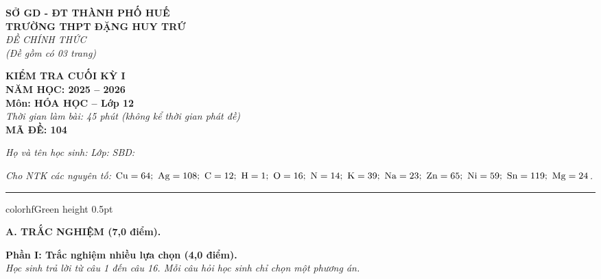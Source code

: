 \documentclass[11pt,a4paper]{article}
\begin{document}
\begin{minipage}[t]{0.48\textwidth}
\textbf{SỞ GD - ĐT THÀNH PHỐ HUẾ}\\
\textbf{TRƯỜNG THPT ĐẶNG HUY TRỨ}\\
\textit{ĐỀ CHÍNH THỨC}\\
\textit{(Đề gồm có 03 trang)}
\end{minipage}
\hfill
\begin{minipage}[t]{0.48\textwidth}
\raggedleft
\textbf{\color{hfRed}KIỂM TRA CUỐI KỲ I}\\
\textbf{NĂM HỌC: 2025 -- 2026}\\
\textbf{Môn: HÓA HỌC -- Lớp 12}\\
\textit{Thời gian làm bài: 45 phút (không kể thời gian phát đề)}\\
\textbf{MÃ ĐỀ: 104}
\end{minipage}

\vspace{4pt}
\noindent
\textit{Họ và tên học sinh:} \dotfill \textit{Lớp:} \dotfill \textit{SBD:} \dotfill

\vspace{3pt}
\noindent
\textit{\footnotesize Cho NTK các nguyên tố: $\ce{Cu}=64;\ \ce{Ag}=108;\ \ce{C}=12;\ \ce{H}=1;\ \ce{O}=16;\ \ce{N}=14;\ \ce{K}=39;\ \ce{Na}=23;\ \ce{Zn}=65;\ \ce{Ni}=59;\ \ce{Sn}=119;\ \ce{Mg}=24$.}

\vspace{3pt}
\hrule color{hfGreen} height 0.5pt

\vspace{4pt}
\noindent
{\color{mainGreen}\textbf{\Large A. TRẮC NGHIỆM (7,0 điểm).}}

\vspace{3pt}
\noindent
{\color{mainGreen}\textbf{\large Phần I: Trắc nghiệm nhiều lựa chọn (4,0 điểm).}}\\
\textit{\small Học sinh trả lời từ câu 1 đến câu 16. Mỗi câu hỏi học sinh chỉ chọn một phương án.}
\vspace{2pt}
\end{document}
